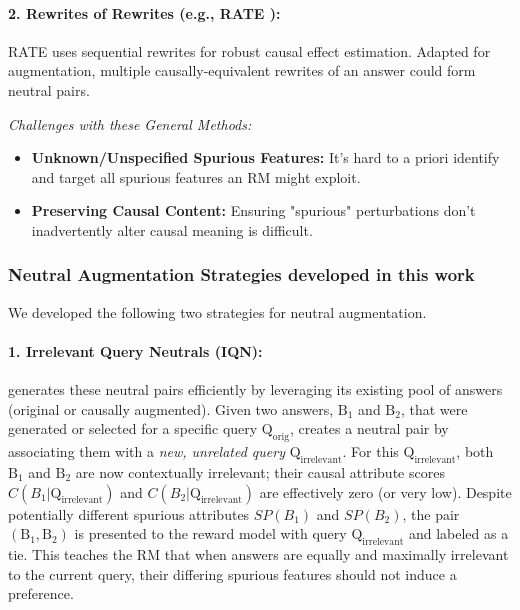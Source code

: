 \paragraph{2. Rewrites of Rewrites (e.g., RATE \citep{reber2024rate}):}
RATE uses sequential rewrites for robust causal effect estimation. Adapted for augmentation, multiple causally-equivalent rewrites of an answer could form neutral pairs.

\textit{Challenges with these General Methods:}
\begin{itemize}[itemsep=0pt,left=8pt]
    \item \textbf{Unknown/Unspecified Spurious Features:} It's hard to a priori identify and target all spurious features an RM might exploit.
    \item \textbf{Preserving Causal Content:} Ensuring "spurious" perturbations don't inadvertently alter causal meaning is difficult.
\end{itemize}

\subsubsection{Neutral Augmentation Strategies developed in this work}
We developed the following two strategies for neutral augmentation.

\paragraph{1. Irrelevant Query Neutrals (IQN):}
\carma{} generates these neutral pairs efficiently by leveraging its existing pool of answers (original or causally augmented). Given two answers, $\mathrm{B}_1$ and $\mathrm{B}_2$, that were generated or selected for a specific query $\mathrm{Q}_{\text{orig}}$, \carma{} creates a neutral pair by associating them with a \textit{new, unrelated query} $\mathrm{Q}_{\text{irrelevant}}$.
For this $\mathrm{Q}_{\text{irrelevant}}$, both $\mathrm{B}_1$ and $\mathrm{B}_2$ are now contextually irrelevant; their causal attribute scores $C(B_1 | \mathrm{Q}_{\text{irrelevant}})$ and $C(B_2 | \mathrm{Q}_{\text{irrelevant}})$ are effectively zero (or very low). Despite potentially different spurious attributes $SP(B_1)$ and $SP(B_2)$, the pair $(\mathrm{B}_1, \mathrm{B}_2)$ is presented to the reward model with query $\mathrm{Q}_{\text{irrelevant}}$ and labeled as a tie.
This teaches the RM that when answers are equally and maximally irrelevant to the current query, their differing spurious features should not induce a preference.

